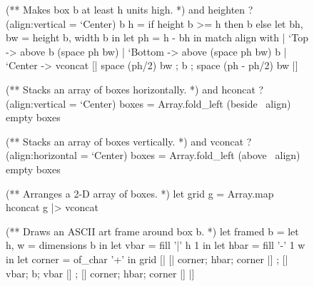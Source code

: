 \documentclass{article}
\begin{document}
\begin{figure}
\begin{code}[ocaml]
(** Makes box b at least h units high. *)
and heighten ?(align:vertical = `Center) b h =\label{ref-heighten}
    if height b >= h then b
    else let bh, bw = height b, width b in
         let ph = h - bh in
         match align with
         | `Top    -> above b (space ph bw)
         | `Bottom -> above (space ph bw) b
         | `Center -> vconcat [| space (ph/2) bw
                               ; b
                               ; space (ph - ph/2) bw |]

(** Stacks an array of boxes horizontally. *)
and hconcat ?(align:vertical = `Center) boxes =\label{ref-hconcat}
    Array.fold_left (beside ~align) empty boxes

(** Stacks an array of boxes vertically. *)
and vconcat ?(align:horizontal = `Center) boxes =\label{ref-vconcat}
    Array.fold_left (above ~align) empty boxes

(** Arranges a 2-D array of boxes. *)
let grid g = Array.map hconcat g |> vconcat\label{ref-grid}

(** Draws an ASCII art frame around box b. *)
let framed b =
    let h, w = dimensions b in
    let vbar = fill '|' h 1 in
    let hbar = fill '-' 1 w in
    let corner = of_char '+' in
    grid [| [| corner; hbar; corner |]
          ; [| vbar;   b;    vbar   |]
          ; [| corner; hbar; corner |] |]
\end{code}
\end{figure}
\end{document}
